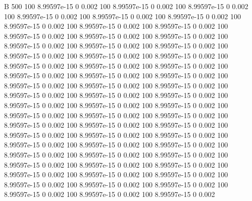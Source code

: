  
 
 
B    500
100  8.99597e-15            0        0.002
100  8.99597e-15            0        0.002
100  8.99597e-15            0        0.002
100  8.99597e-15            0        0.002
100  8.99597e-15            0        0.002
100  8.99597e-15            0        0.002
100  8.99597e-15            0        0.002
100  8.99597e-15            0        0.002
100  8.99597e-15            0        0.002
100  8.99597e-15            0        0.002
100  8.99597e-15            0        0.002
100  8.99597e-15            0        0.002
100  8.99597e-15            0        0.002
100  8.99597e-15            0        0.002
100  8.99597e-15            0        0.002
100  8.99597e-15            0        0.002
100  8.99597e-15            0        0.002
100  8.99597e-15            0        0.002
100  8.99597e-15            0        0.002
100  8.99597e-15            0        0.002
100  8.99597e-15            0        0.002
100  8.99597e-15            0        0.002
100  8.99597e-15            0        0.002
100  8.99597e-15            0        0.002
100  8.99597e-15            0        0.002
100  8.99597e-15            0        0.002
100  8.99597e-15            0        0.002
100  8.99597e-15            0        0.002
100  8.99597e-15            0        0.002
100  8.99597e-15            0        0.002
100  8.99597e-15            0        0.002
100  8.99597e-15            0        0.002
100  8.99597e-15            0        0.002
100  8.99597e-15            0        0.002
100  8.99597e-15            0        0.002
100  8.99597e-15            0        0.002
100  8.99597e-15            0        0.002
100  8.99597e-15            0        0.002
100  8.99597e-15            0        0.002
100  8.99597e-15            0        0.002
100  8.99597e-15            0        0.002
100  8.99597e-15            0        0.002
100  8.99597e-15            0        0.002
100  8.99597e-15            0        0.002
100  8.99597e-15            0        0.002
100  8.99597e-15            0        0.002
100  8.99597e-15            0        0.002
100  8.99597e-15            0        0.002
100  8.99597e-15            0        0.002
100  8.99597e-15            0        0.002
100  8.99597e-15            0        0.002
100  8.99597e-15            0        0.002
100  8.99597e-15            0        0.002
100  8.99597e-15            0        0.002
100  8.99597e-15            0        0.002
100  8.99597e-15            0        0.002
100  8.99597e-15            0        0.002
100  8.99597e-15            0        0.002
100  8.99597e-15            0        0.002
100  8.99597e-15            0        0.002
